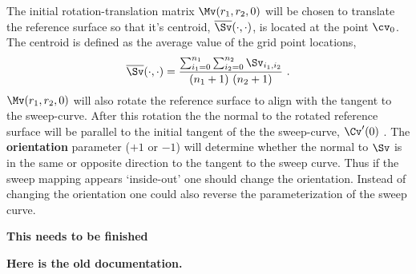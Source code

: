 The initial rotation-translation matrix $\Mv(r_1,r_2,0)$ will be chosen to translate the reference surface
so that it's centroid, $\overline{\Sv}(\cdot,\cdot)$,  is located at the point $\cv_0$.
The centroid is defined as the average value of the grid point locations,
 \[
	\overline{\Sv}(\cdot,\cdot) = {\sum_{i_1=0}^{n_1}\sum_{i_2=0}^{n_2} \Sv_{i_1,i_2} \over (n_1+1)~(n_2+1) } ~.
\]
$\Mv(r_1,r_2,0)$ will also 
rotate the reference surface to align with the tangent to the sweep-curve. After this rotation the
the normal to the rotated reference surface will be parallel to the initial tangent 
of the the sweep-curve, $\Cv'(0)$ . The {\bf orientation} parameter ($+1$ or $-1$) will determine whether
the normal to $\Sv$ is in the same or opposite direction to the tangent to the sweep curve.
Thus if the sweep mapping appears `inside-out' one should change the orientation. Instead of changing the
orientation one could also reverse the parameterization of the sweep curve.


{\bf This needs to be finished}

\baselineskip
{\bf Here is the old documentation.}


